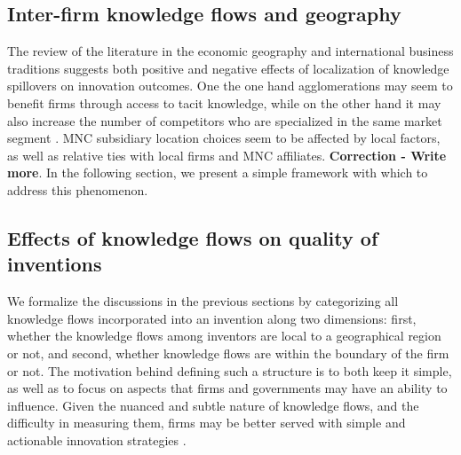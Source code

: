 \documentclass[12pt,letterpaper]{article}
\begin{document}
\subsection{Inter-firm knowledge flows and geography}
The review of the literature in the economic geography and international business traditions suggests both positive and negative effects of localization of knowledge spillovers on innovation outcomes.  One the one hand agglomerations may seem to benefit firms through access to tacit knowledge, while on the other hand it may also increase the number of competitors who are specialized in the same market segment \citep{todo}. MNC subsidiary location choices seem to be affected by local factors, as well as relative ties with local firms and MNC affiliates\citep{todo}. \textbf{Correction - Write more}. In the following section, we present a simple framework with which to address this phenomenon.  

\subsection*{Effects of knowledge flows on quality of inventions}

We formalize the discussions in the previous sections by categorizing all knowledge flows incorporated into an invention along two dimensions:  first, whether the knowledge flows among inventors are local to a geographical region or not, and second, whether knowledge flows are within the boundary of the firm or not. The motivation behind defining such a structure is to both keep it simple, as well as to focus on aspects that firms and governments may have an ability to influence. Given the nuanced and subtle nature of knowledge flows, and the difficulty in measuring them, firms may be better served with simple and actionable innovation strategies \citep{todo}. \par
\end{document}
